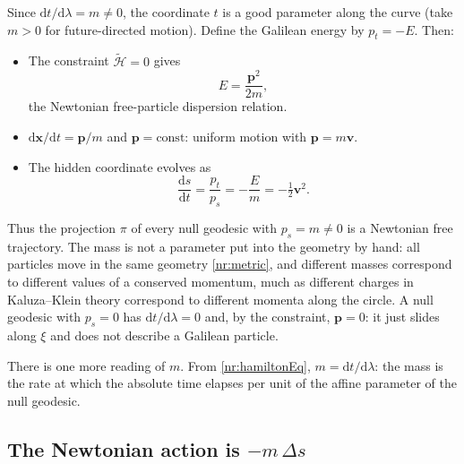 Since $\mathrm{d}t/\mathrm{d}\lambda=m\neq0$, the coordinate $t$ is a good
parameter along the curve (take $m>0$ for future-directed motion). Define the
Galilean energy by $p_t=-E$. Then:
\begin{itemize}
\item The constraint $\tilde{\mathcal{H}}=0$ gives
      \begin{equation}
        E=\frac{\mathbf{p}^2}{2m},
        \label{nr:dispersion}
      \end{equation}
      the Newtonian free-particle dispersion relation.
\item $\mathrm{d}\mathbf{x}/\mathrm{d}t=\mathbf{p}/m$ and $\mathbf{p}=\text{const}$:
      uniform motion with $\mathbf{p}=m\mathbf{v}$.
\item The hidden coordinate evolves as
      \begin{equation}
        \frac{\mathrm{d}s}{\mathrm{d}t}=\frac{p_t}{p_s}=-\frac{E}{m}=-\tfrac12\mathbf{v}^2 .
        \label{nr:sdot}
      \end{equation}
\end{itemize}
Thus the projection $\pi$ of every null geodesic with $p_s=m\neq0$ is a
Newtonian free trajectory. The mass is not a parameter put into the geometry
by hand: all particles move in the same geometry \eqref{nr:metric}, and
different masses correspond to different values of a conserved momentum, much
as different charges in Kaluza--Klein theory correspond to different momenta
along the circle. A null geodesic with $p_s=0$ has $\mathrm{d}t/\mathrm{d}\lambda=0$
and, by the constraint, $\mathbf{p}=0$: it just slides along $\xi$ and does not
describe a Galilean particle.

There is one more reading of $m$. From \eqref{nr:hamiltonEq},
$m=\mathrm{d}t/\mathrm{d}\lambda$: the mass is the rate at which the absolute
time elapses per unit of the affine parameter of the null geodesic.

\subsection{The Newtonian action is $-m\,\Delta s$}

